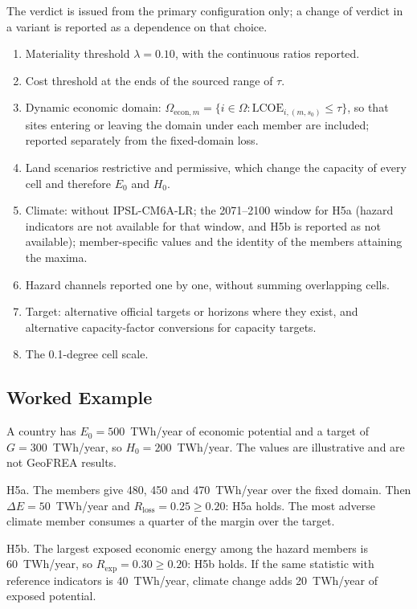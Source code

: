The verdict is issued from the primary configuration only; a change of verdict in
a variant is reported as a dependence on that choice.
\begin{enumerate}
    \item Materiality threshold $\lambda=0.10$, with the continuous ratios reported.
    \item Cost threshold at the ends of the sourced range of $\tau$.
    \item Dynamic economic domain: $\Omega_{\mathrm{econ},m}=\{i\in\Omega:
    \mathrm{LCOE}_{i,(m,s_0)}\leq\tau\}$, so that sites entering or leaving the
    domain under each member are included; reported separately from the
    fixed-domain loss.
    \item Land scenarios restrictive and permissive, which change the capacity of
    every cell and therefore $E_0$ and $H_0$.
    \item Climate: without IPSL-CM6A-LR; the 2071--2100 window for H5a (hazard
    indicators are not available for that window, and H5b is reported as not
    available); member-specific values and the identity of the members attaining
    the maxima.
    \item Hazard channels reported one by one, without summing overlapping cells.
    \item Target: alternative official targets or horizons where they exist, and
    alternative capacity-factor conversions for capacity targets.
    \item The 0.1-degree cell scale.
\end{enumerate}

\subsection{Worked Example}
\label{subsec:h5_example}

A country has $E_0=500$~TWh/year of economic potential and a target of
$G=300$~TWh/year, so $H_0=200$~TWh/year. The values are illustrative and are not
GeoFREA results.

H5a. The members give 480, 450 and 470~TWh/year over the fixed domain. Then
$\Delta E=50$~TWh/year and $R_{\mathrm{loss}}=0.25\geq0.20$: H5a holds. The most
adverse climate member consumes a quarter of the margin over the target.

H5b. The largest exposed economic energy among the hazard members is
60~TWh/year, so $R_{\mathrm{exp}}=0.30\geq0.20$: H5b holds. If the same statistic
with reference indicators is 40~TWh/year, climate change adds 20~TWh/year of
exposed potential.

